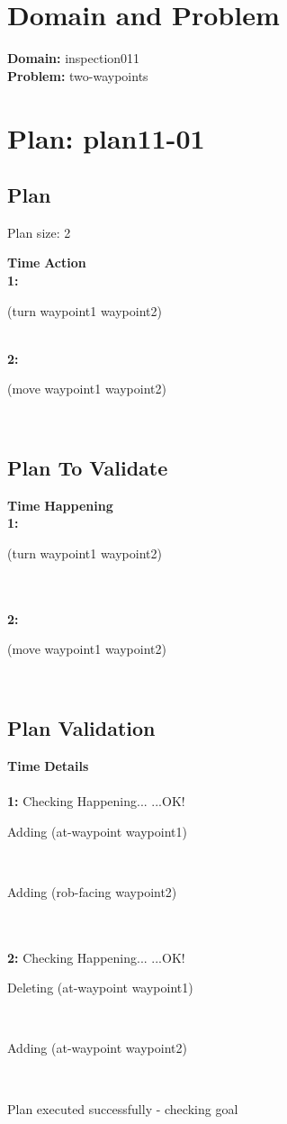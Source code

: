 \documentclass[a4paper,12pt]{article}
\author{\mbox{\sc {\sc Val}}}
\newcommand{\headingtimeaction}{{\bf Time} \qquad \= {\bf Action}\\[0.8ex]}
\newcommand{\headingtimehappening}{{\bf Time} \qquad \= {\bf Happening}\\[0.8ex]}
\newcommand{\headingtimedetails}{{\bf Time} \qquad \= {\bf Details}\\[0.8ex]}
\newcommand{\atime}[1]{{\bf #1:}}
\newcommand{\action}[1]{{\sf #1}}
\newcommand{\exprn}[1]{{\sf #1}}
\newcommand{\checkhappening}{Checking Happening... }
\newcommand{\listrow}[1]{\begin{minipage}[t]{11.5cm} #1 \end{minipage}}
\newcommand{\happeningOK}{...OK!}
\newcommand{\adding}[1]{\listrow{Adding \exprn{#1} }}
\newcommand{\deleting}[1]{\listrow{Deleting \exprn{#1} }}
\begin{document}
 \maketitle 
\section{Domain and Problem}
{\bf Domain:} inspection011\\
{\bf Problem:} two-waypoints
\section{\sloppy Plan: plan11-01}
\subsection{Plan}
Plan size: 2
\begin{tabbing}
\headingtimeaction 
\atime{1} \> \listrow{\action{(turn waypoint1 waypoint2)}}\\
\atime{2} \> \listrow{\action{(move waypoint1 waypoint2)}}\\
\end{tabbing}
\subsection{Plan To Validate}
\begin{tabbing}
\headingtimehappening 
\atime{1}  \> \listrow{\action{(turn waypoint1 waypoint2)}}\\
\\\atime{2}  \> \listrow{\action{(move waypoint1 waypoint2)}}\\
\end{tabbing}

\subsection{Plan Validation}
\begin{tabbing}
\headingtimedetails 
\\
\atime{1} \> \checkhappening\happeningOK\\
 \> \adding{(at-waypoint waypoint1)}\\
 \> \adding{(rob-facing waypoint2)}\\
\\
\atime{2} \> \checkhappening\happeningOK\\
 \> \deleting{(at-waypoint waypoint1)}\\
 \> \adding{(at-waypoint waypoint2)}\\
\end{tabbing}
Plan executed successfully - checking goal\\
\\
\end{document}
